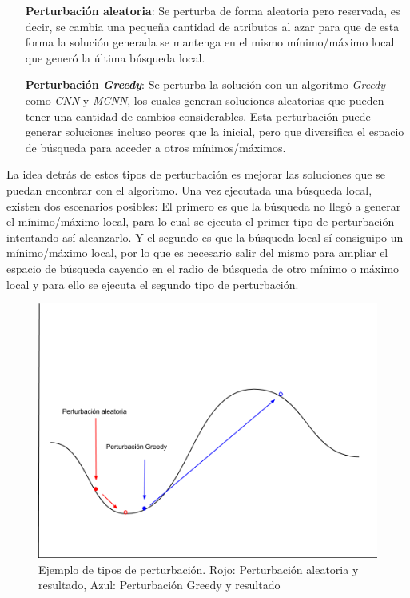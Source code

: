 \documentclass{ci5652}
\begin{document}
\begin{itemize}
\item [\textbf{Perturbación aleatoria}:] Se perturba de forma aleatoria pero reservada, es decir, se cambia una pequeña cantidad de atributos al azar para que de esta forma la solución generada se mantenga en el mismo mínimo/máximo local que generó la última búsqueda local.
\item [\textbf{Perturbación \textit{Greedy}}:] Se perturba la solución con un algoritmo \textit{Greedy} como \textit{CNN }y \textit{MCNN}, los cuales generan soluciones aleatorias que pueden tener una cantidad de cambios considerables. Esta perturbación puede generar soluciones incluso peores que la inicial, pero que diversifica el espacio de búsqueda para acceder a otros mínimos/máximos. 
\end{itemize}

La idea detrás de estos tipos de perturbación es mejorar las soluciones que se puedan encontrar con el algoritmo. Una vez ejecutada una búsqueda local, existen dos escenarios posibles: El primero es que la búsqueda no llegó a generar el mínimo/máximo local, para lo cual se ejecuta el primer tipo de perturbación intentando así alcanzarlo. Y el segundo es que la búsqueda local sí consiguipo un mínimo/máximo local, por lo que es necesario salir del mismo para ampliar el espacio de búsqueda cayendo en el radio de búsqueda de otro mínimo o máximo local y para ello se ejecuta el segundo tipo de perturbación.

\begin{figure}[h!]
	\centering
	\includegraphics[width=\linewidth]{perturbaciones}
	\caption{Ejemplo de tipos de perturbación. Rojo: Perturbación aleatoria y resultado, Azul: Perturbación Greedy y resultado}
	\label{fig:euler3}
\end{figure}
\end{document}
